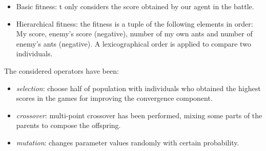 \documentclass[runningheads]{llncs}
\begin{document}
\begin{itemize}
\item Basic fitness: t only considers the score obtained by our agent in the battle.
\item Hierarchical fitness: the fitness is a tuple of the following elements in order: My score, enemy's score (negative), number of my own ants and number of enemy's ants (negative). A lexicographical order is applied to compare two individuals.

\end{itemize}

The considered operators have been:
\begin{itemize}
\item \textit{selection}: choose half of population with individuals who obtained the highest scores in the games for improving the convergence component.
\item \textit{crossover}: multi-point crossover has been performed, mixing some parts of the parents to compose the offspring.
\item \textit{mutation}: changes parameter values randomly with certain probability.
\end{itemize}


 
\end{document}
